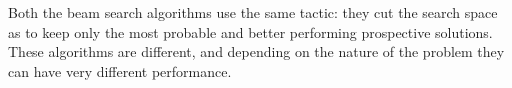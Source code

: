 \vspace{0.2 cm}
Both the beam search algorithms use the same tactic: they cut the search space as to keep only the most probable and better performing prospective solutions. These algorithms are different, and depending on the nature of the problem they can have very different performance.







